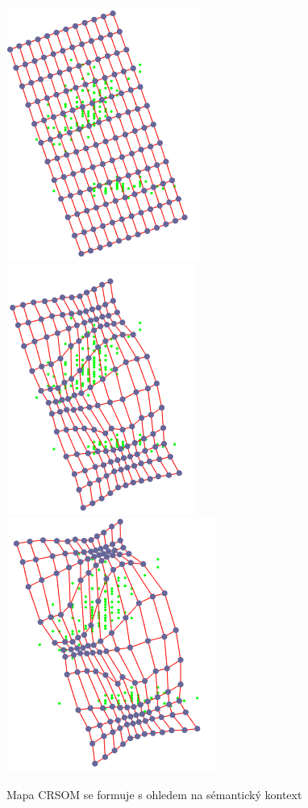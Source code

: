 \documentclass[thesis=M,czech]{FITthesis}[2012/06/26]
\begin{document}
\begin{figure}[htp]
    \centering
    
    \includegraphics[width=.32\textwidth]{cr1.png}
    \includegraphics[width=.32\textwidth]{cr2.png}
    \includegraphics[width=.32\textwidth]{cr3.png}
    \caption{Mapa CRSOM se formuje s ohledem na sémantický kontext}
    \label{fig:cr}
\end{figure}
\end{document}
